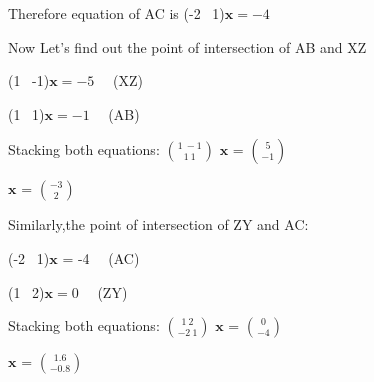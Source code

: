 \documentclass{beamer}
\begin{document}
\begin{frame}
\vspace{2 mm}
\setlength{\parindent}{2cm}
Therefore equation of AC is (-2 \ 1)$\boldsymbol{x}=-4$
\vspace{2 mm}




\setlength{\parindent}{0cm}

Now Let's find out the point of intersection of AB and XZ

\setlength{\parindent}{3.6cm}
\vspace{2 mm}
(1 \ -1)$\boldsymbol{x} = -5$    \ \ (XZ)

\vspace{2 mm}
(1 \ 1)$\boldsymbol{x}=-1$           \ \ (AB)

\vspace{2 mm}
 \setlength{\parindent}{0cm}
  Stacking both equations:
  \setlength{\parindent}{3.6cm}
  \vspace{2 mm}
   $\binom{1 \ -1}{1 \ 1}$ $\boldsymbol{x}$ = $\binom{5}{-1}$

   \vspace{2 mm}
$\boldsymbol{x}$ = $\binom{-3}{2}$

\setlength{\parindent}{0cm}
Similarly,the point of intersection of ZY and AC:

\setlength{\parindent}{3.6cm}
(-2 \ 1)$\boldsymbol{x}$ = -4          \ \ (AC)

\vspace{2 mm}
  (1 \  2)$\boldsymbol{x}=0$                 \ \ (ZY)
  
\vspace{2 mm}
  \setlength{\parindent}{0cm}
  Stacking both equations:
  \setlength{\parindent}{3.6cm}
  \vspace{2 mm}
  $\binom{1 \ 2}{-2 \ 1}$ $\boldsymbol{x}$ = $\binom{0}{-4}$
  \vspace{2 mm}
  
  
$\boldsymbol{x}$ = $\binom{1.6}{-0.8}$
\end{frame}
\end{document}
